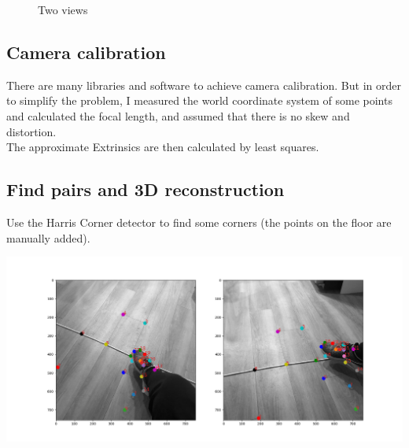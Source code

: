 \documentclass[12pt]{article}
\begin{document}
\begin{figure}[ht!]
\begin{subfigure}[b]{0.4\textwidth}
		\end{subfigure}
		
		\caption{Two views}
	\end{figure}
	
	\subsection{Camera calibration}
		There are many libraries and software to achieve camera calibration. But in order to simplify the problem, I measured the world coordinate system of some points and calculated the focal length, and assumed that there is no skew and distortion.\\
		The approximate Extrinsics are then calculated by least squares.
	\subsection{Find pairs and 3D reconstruction}
		Use the Harris Corner detector to find some corners (the points on the floor are manually added).
		\begin{center}
			\includegraphics[width=1\textwidth]{points.png}
		\end{center}
\end{document}
